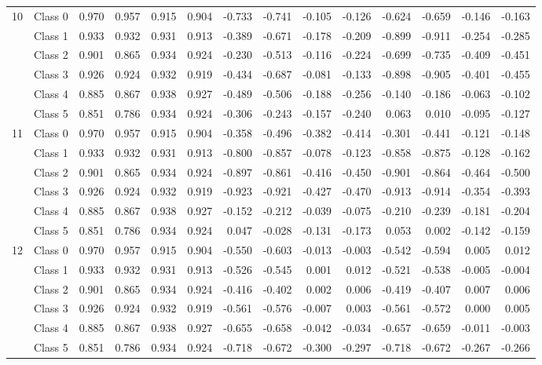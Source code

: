 \begin{table*}[t]
\begin{tabular}{l|l|rrrr|rrrr|rrrr}
\midrule
\multirow{6}{*}{10} 
&Class 0 & 0.970 & 0.957 & 0.915 & 0.904 & -0.733 & -0.741 & -0.105 & -0.126 & -0.624 & -0.659 & -0.146 & -0.163 \\
&Class 1 & 0.933 & 0.932 & 0.931 & 0.913 & -0.389 & -0.671 & -0.178 & -0.209 & -0.899 & -0.911 & -0.254 & -0.285 \\
&Class 2 & 0.901 & 0.865 & 0.934 & 0.924 & -0.230 & -0.513 & -0.116 & -0.224 & -0.699 & -0.735 & -0.409 & -0.451 \\
&Class 3 & 0.926 & 0.924 & 0.932 & 0.919 & -0.434 & -0.687 & -0.081 & -0.133 & -0.898 & -0.905 & -0.401 & -0.455 \\
&Class 4 & 0.885 & 0.867 & 0.938 & 0.927 & -0.489 & -0.506 & -0.188 & -0.256 & -0.140 & -0.186 & -0.063 & -0.102 \\
&Class 5 & 0.851 & 0.786 & 0.934 & 0.924 & -0.306 & -0.243 & -0.157 & -0.240 & 0.063 & 0.010 & -0.095 & -0.127 \\
\midrule
\multirow{6}{*}{11} 
&Class 0 & 0.970 & 0.957 & 0.915 & 0.904 & -0.358 & -0.496 & -0.382 & -0.414 & -0.301 & -0.441 & -0.121 & -0.148 \\
&Class 1 & 0.933 & 0.932 & 0.931 & 0.913 & -0.800 & -0.857 & -0.078 & -0.123 & -0.858 & -0.875 & -0.128 & -0.162 \\
&Class 2 & 0.901 & 0.865 & 0.934 & 0.924 & -0.897 & -0.861 & -0.416 & -0.450 & -0.901 & -0.864 & -0.464 & -0.500 \\
&Class 3 & 0.926 & 0.924 & 0.932 & 0.919 & -0.923 & -0.921 & -0.427 & -0.470 & -0.913 & -0.914 & -0.354 & -0.393 \\
&Class 4 & 0.885 & 0.867 & 0.938 & 0.927 & -0.152 & -0.212 & -0.039 & -0.075 & -0.210 & -0.239 & -0.181 & -0.204 \\
&Class 5 & 0.851 & 0.786 & 0.934 & 0.924 & 0.047 & -0.028 & -0.131 & -0.173 & 0.053 & 0.002 & -0.142 & -0.159 \\
\midrule
\multirow{6}{*}{12} 
&Class 0 & 0.970 & 0.957 & 0.915 & 0.904 & -0.550 & -0.603 & -0.013 & -0.003 & -0.542 & -0.594 & 0.005 & 0.012 \\
&Class 1 & 0.933 & 0.932 & 0.931 & 0.913 & -0.526 & -0.545 & 0.001 & 0.012 & -0.521 & -0.538 & -0.005 & -0.004 \\
&Class 2 & 0.901 & 0.865 & 0.934 & 0.924 & -0.416 & -0.402 & 0.002 & 0.006 & -0.419 & -0.407 & 0.007 & 0.006 \\
&Class 3 & 0.926 & 0.924 & 0.932 & 0.919 & -0.561 & -0.576 & -0.007 & 0.003 & -0.561 & -0.572 & 0.000 & 0.005 \\
&Class 4 & 0.885 & 0.867 & 0.938 & 0.927 & -0.655 & -0.658 & -0.042 & -0.034 & -0.657 & -0.659 & -0.011 & -0.003 \\
&Class 5 & 0.851 & 0.786 & 0.934 & 0.924 & -0.718 & -0.672 & -0.300 & -0.297 & -0.718 & -0.672 & -0.267 & -0.266 \\



\bottomrule
\end{tabular}

\label{tab:layer_abiliation_emotions_2}
\end{table*}









